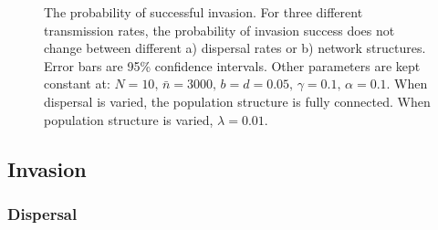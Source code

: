 \begin{knitrout}\footnotesize
{}\color{fgcolor}\begin{figure}[t]

{\centering {}

}

\caption[The probability of successful invasion]{The probability of successful invasion. 
  For three different transmission rates, the probability of invasion success does not change between different a) dispersal rates or b) network structures. 
  Error bars are 95\% confidence intervals. 
  Other parameters are kept constant at: $N = 10,\, \bar{n} = 3000,\, b = d = 0.05,\, \gamma = 0.1,\, \alpha = 0.1$. 
  When dispersal is varied, the population structure is fully connected. When population structure is varied, $\lambda = 0.01$.}\label{f:invasionPropPlots}
\end{figure}


\end{knitrout}



\subsection{Invasion}


\subsubsection{Dispersal}


